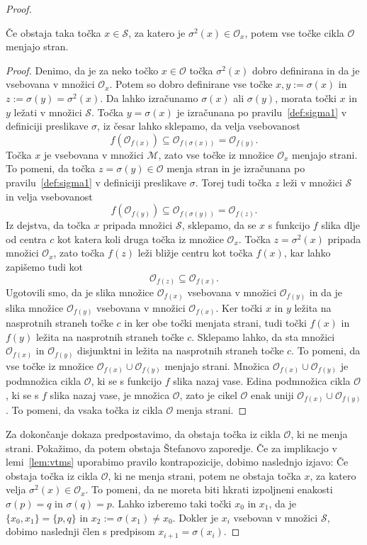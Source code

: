 \documentclass[../TG_magistrsko_delo_sections.tex]{subfiles}
\begin{document}
\begin{proof}
\begin{lema}\label{lem:vtms}
Če obstaja taka točka $x \in \mathcal{S}$, za katero je $\sigma^2(x) \in \mathcal{O}_x$, potem vse točke cikla $\mathcal{O}$ menjajo stran.
\end{lema}
\begin{proof}
Denimo, da je za neko točko $x \in \mathcal{O}$ točka $\sigma^2(x)$ dobro definirana in da je vsebovana v množici $\mathcal{O}_x$. Potem so dobro definirane vse točke $x, y:=\sigma(x)$ in $z:=\sigma(y) = \sigma^2(x)$. Da lahko izračunamo $\sigma(x)$ ali $\sigma(y)$, morata točki $x$ in $y$ ležati v množici $\mathcal{S}$. Točka $y=\sigma(x)$ je izračunana po pravilu~\ref{def:sigma1} v definiciji preslikave $\sigma$, iz česar lahko sklepamo, da velja vsebovanost
$$f(\mathcal{O}_{f(x)}) \subseteq \mathcal{O}_{f(\sigma(x))}=\mathcal{O}_{f(y)}.$$
Točka $x$ je vsebovana v množici $\mathcal{M}$, zato vse točke iz množice $\mathcal{O}_x$ menjajo strani. To pomeni, da točka $z = \sigma(y) \in \mathcal{O}$ menja stran in je izračunana po pravilu~\ref{def:sigma1} v definiciji preslikave $\sigma$. Torej tudi točka $z$ leži v množici $\mathcal{S}$ in velja vsebovanost
$$f(\mathcal{O}_{f(y)}) \subseteq \mathcal{O}_{f(\sigma(y))}=\mathcal{O}_{f(z)}.$$
Iz dejstva, da točka $x$ pripada množici $\mathcal{S}$, sklepamo, da se $x$ s funkcijo $f$ slika dlje od centra $c$ kot katera koli druga točka iz množice $\mathcal{O}_x$. Točka $z=\sigma^2(x)$ pripada množici $\mathcal{O}_x$, zato točka $f(z)$ leži bližje centru kot točka $f(x)$, kar lahko zapišemo tudi kot
$$\mathcal{O}_{f(z)} \subseteq \mathcal{O}_{f(x)}.$$
Ugotovili smo, da je slika množice $\mathcal{O}_{f(x)}$ vsebovana v množici $\mathcal{O}_{f(y)}$ in da je slika množice $\mathcal{O}_{f(y)}$ vsebovana v množici $\mathcal{O}_{f(x)}$. Ker točki $x$ in $y$ ležita na nasprotnih straneh točke $c$ in ker obe točki menjata strani, tudi točki $f(x)$ in $f(y)$ ležita na nasprotnih straneh točke $c$. Sklepamo lahko, da sta množici $\mathcal{O}_{f(x)}$ in $\mathcal{O}_{f(y)}$ disjunktni in ležita na nasprotnih straneh točke $c$. To pomeni, da vse točke iz množice $\mathcal{O}_{f(x)} \cup \mathcal{O}_{f(y)}$ menjajo strani. Množica $\mathcal{O}_{f(x)} \cup \mathcal{O}_{f(y)}$ je podmnožica cikla $\mathcal{O}$, ki se s funkcijo $f$ slika nazaj vase. Edina podmnožica cikla $\mathcal{O}$, ki se s $f$ slika nazaj vase, je množica $\mathcal{O}$, zato je cikel $\mathcal{O}$ enak uniji $\mathcal{O}_{f(x)} \cup \mathcal{O}_{f(y)}$. To pomeni, da vsaka točka iz cikla $\mathcal{O}$ menja strani. 
\end{proof}
Za dokončanje dokaza predpostavimo, da obstaja točka iz cikla $\mathcal{O}$, ki ne menja strani. Pokažimo, da potem obstaja Štefanovo zaporedje.
Če za implikacjo v lemi~\ref{lem:vtms} uporabimo pravilo kontrapozicije, dobimo naslednjo izjavo: Če obstaja točka iz cikla $\mathcal{O}$, ki ne menja strani, potem ne obstaja točka $x$, za katero velja $\sigma^2(x) \in \mathcal{O}_x$. To pomeni, da ne moreta biti hkrati izpoljneni enakosti $\sigma(p) = q$ in $\sigma(q) = p$. Lahko izberemo taki točki $x_0$ in $x_1$, da je $\{x_0, x_1\} = \{p, q\}$ in $x_2 := \sigma(x_1) \neq x_0$. Dokler je $x_i$ vsebovan v množici $\mathcal{S}$, dobimo naslednji člen s predpisom $x_{i+1} = \sigma(x_i)$.


\end{proof}
\end{document}

